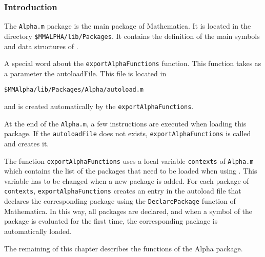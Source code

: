 % 
\subsubsection{Introduction}
The \texttt{Alpha.m} package is the main package of Mathematica.
It is located in the directory \texttt{\$MMALPHA/lib/Packages}.
It contains the definition of the main symbols and data structures
of \MMAlpha{}. 

A special word about the \texttt{exportAlphaFunctions} function.
This function takes as a parameter the autoloadFile. This file
is located in 
\begin{verbatim}
$MMAlpha/lib/Packages/Alpha/autoload.m
\end{verbatim}
and is created automatically by the \texttt{exportAlphaFunctions}.

At the end of the \texttt{Alpha.m}, a few instructions are executed
when loading this package. If the \texttt{autoloadFile} does not
exists, \texttt{exportAlphaFunctions} is called and creates it.

The function \texttt{exportAlphaFunctions} uses a local variable
\texttt{contexts} of \texttt{Alpha.m} which contains the list of 
the packages that need to be loaded when using \MMAlpha{}. This variable
has to be changed when a new package is added. For each package
of \texttt{contexts}, \texttt{exportAlphaFunctions} creates an 
entry in the autoload file that declares the corresponding package
using the \texttt{DeclarePackage} function of Mathematica. In this
way, all packages are declared, and when a symbol of the package
is evaluated for the first time, 
the corresponding package is automatically loaded.

The remaining of this chapter describes the functions of the 
Alpha package.